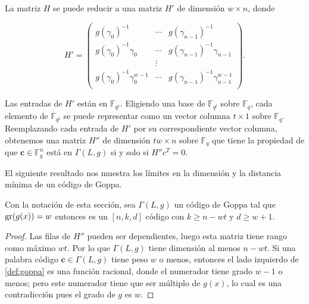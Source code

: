\begin{proposition}
    La matriz $H$ se puede reducir a una matriz $H'$ de dimensión $w \times n$, donde 

    \begin{equation}
        H' = \left(
            \begin{array}{ccc} 
                g(\gamma_0)^{-1} & \cdots & g(\gamma_{n-1})^{-1}  \\
                g(\gamma_0)^{-1} \gamma_0 & \cdots & g(\gamma_{n-1})^{-1} \gamma_{n-1} \\
                & \vdots & \\
                g(\gamma_0)^{-1} \gamma_0^{w-1} & \cdots & g(\gamma_{n-1})^{-1} \gamma_{n-1}^{w-1} \\
            \end{array}
            \right).
    \end{equation}
\end{proposition}

Las entradas de $H'$ están en $\mathbb{F}_{q^t}$. Eligiendo una base de $\mathbb{F}_{q^t}$ sobre $\mathbb{F}_q$, cada elemento de $\mathbb{F}_{q^t}$ se puede representar como un vector columna $t \times 1$ sobre $\mathbb{F}_q$. Reemplazando cada entrada de $H'$ por su correspondiente vector columna, obtenemos una matriz $H''$ de dimensión $tw \times n$ sobre $\mathbb{F}_{q}$ que tiene la propiedad de que $\textbf{c} \in \mathbb{F}_q^n$ está en $\Gamma(L,g)$ si y solo si $H''c^T = 0$.

El siguiente resultado nos muestra los límites en la dimensión y la distancia mínima de un código de Goppa.

\begin{theorem}
    \label{th:dist_min_Goppa}
    Con la notación de esta sección, sea $\Gamma(L,g)$ un código de Goppa tal que $\operatorname{gr}(g(x)) = w$ entonces es un $[n, k, d]$ código con $k \geq n - wt$ y $d \geq w + 1$.
\end{theorem}

\begin{proof}
    Las filas de $H''$ pueden ser dependientes, luego esta matriz tiene rango como máximo $wt$. Por lo que $\Gamma(L,g)$ tiene dimensión al menos $n - wt$. Si una palabra código $\textbf{c} \in \Gamma(L,g)$ tiene peso $w$ o menos, entonces el lado izquierdo de \ref{def:goppa} es una función racional, donde el numerador tiene grado $w - 1$ o menos; pero este numerador tiene que ser múltiplo de $g(x)$, lo cual es una contradicción pues el grado de $g$ es $w$.
\end{proof}

